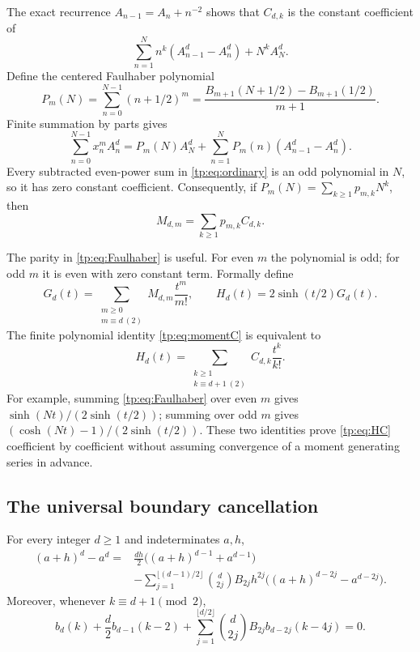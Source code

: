 The exact recurrence
$A_{n-1}=A_n+n^{-2}$ shows that $C_{d,k}$ is the constant coefficient
of
\[
 \sum_{n=1}^N n^k(A_{n-1}^d-A_n^d)+N^kA_N^d.
\]
Define the centered Faulhaber polynomial
\begin{equation}\label{tp:eq:Faulhaber}
 P_m(N)=\sum_{n=0}^{N-1}(n+1/2)^m
 =\frac{B_{m+1}(N+1/2)-B_{m+1}(1/2)}{m+1}.
\end{equation}
Finite summation by parts gives
\begin{equation}\label{tp:eq:finiteSBP}
 \sum_{n=0}^{N-1}x_n^m A_n^d
 =P_m(N)A_N^d+
   \sum_{n=1}^N P_m(n)(A_{n-1}^d-A_n^d).
\end{equation}
Every subtracted even-power sum in \eqref{tp:eq:ordinary} is an odd
polynomial in $N$, so it has zero constant coefficient.  Consequently,
if $P_m(N)=\sum_{k\geq1}p_{m,k}N^k$, then
\begin{equation}\label{tp:eq:momentC}
 M_{d,m}=\sum_{k\geq1}p_{m,k}C_{d,k}.
\end{equation}

The parity in \eqref{tp:eq:Faulhaber} is useful.  For even $m$ the
polynomial is odd; for odd $m$ it is even with zero constant term.
Formally define
\begin{equation}\label{tp:eq:GH}
 G_d(t)=\sum_{\substack{m\geq0\\m\equiv d\ (2)}}M_{d,m}\frac{t^m}{m!},
 \qquad H_d(t)=2\sinh(t/2)G_d(t).
\end{equation}
The finite polynomial identity \eqref{tp:eq:momentC} is equivalent to
\begin{equation}\label{tp:eq:HC}
 H_d(t)=\sum_{\substack{k\geq1\\k\equiv d+1\ (2)}}C_{d,k}\frac{t^k}{k!}.
\end{equation}
For example, summing \eqref{tp:eq:Faulhaber} over even $m$ gives
$\sinh(Nt)/(2\sinh(t/2))$; summing over odd $m$ gives
$(\cosh(Nt)-1)/(2\sinh(t/2))$.  These two identities prove
\eqref{tp:eq:HC} coefficient by coefficient without assuming convergence
of a moment generating series in advance.

\subsection{The universal boundary cancellation}

\begin{lemma}
\label{tp:lem:EM}
For every integer $d\geq1$ and indeterminates $a,h$,
\begin{equation}\label{tp:eq:EM}
 \begin{split}
 (a+h)^d-a^d={}&\frac{dh}{2}\bigl((a+h)^{d-1}+a^{d-1}\bigr)\\
 &-\sum_{j=1}^{\lfloor(d-1)/2\rfloor}
      \binom d{2j}B_{2j}h^{2j}
      \bigl((a+h)^{d-2j}-a^{d-2j}\bigr).
 \end{split}
\end{equation}
Moreover, whenever $k\equiv d+1\pmod2$,
\begin{equation}\label{tp:eq:boundary}
 b_d(k)+\frac d2 b_{d-1}(k-2)
 +\sum_{j=1}^{\lfloor d/2\rfloor}
      \binom d{2j}B_{2j}b_{d-2j}(k-4j)=0.
\end{equation}
\end{lemma}

